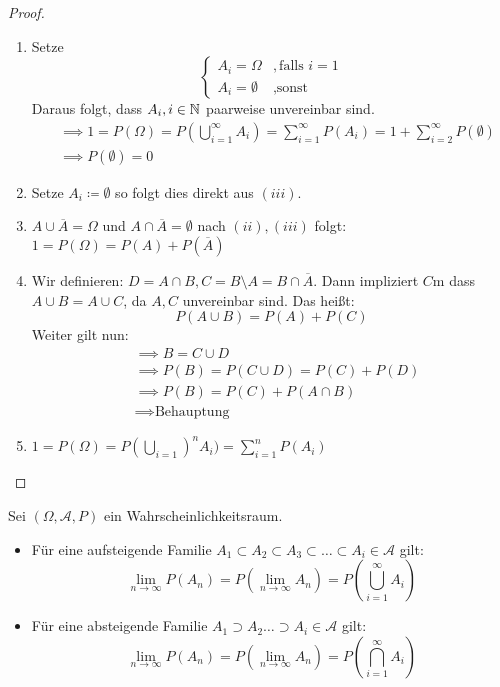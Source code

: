 \begin{proof}
\begin{enumerate}[label=\arabic*)]
	\item Setze \[\begin{cases}
			A_i = \Omega &, \text{falls } i=1 \\
			A_i = \emptyset &, \text{sonst}
		\end{cases} \]
		Daraus folgt, dass $A_i, i \in \mathbb{N}$ paarweise unvereinbar sind.
		\begin{align*}
			&\implies 1= P(\Omega) = P(\bigcup_{i=1}^{\infty} A_i) = \sum_{i=1}^{\infty}P(A_i) = 1+ \sum_{i=2}^{\infty}P(\emptyset) \\
			&\implies P(\emptyset)=0
		\end{align*}
	\item Setze $A_i \coloneqq \emptyset$ so folgt dies direkt aus $(iii)$.
	\item $A \cup \overline{A} = \Omega$ und $A \cap \overline{A}= \emptyset$ nach $(ii), (iii)$ folgt: $1=P(\Omega)= P(A)+P(\overline{A})$ 
	\item Wir definieren: $D= A \cap B, C= B \setminus A = B \cap \overline{A}$. Dann impliziert $C$m dass $A \cup B = A \cup C$, da $A,C$ unvereinbar sind. Das heißt:\[P(A \cup B) = P(A) + P(C)\]
	Weiter gilt nun:
	\begin{align*}
	&\implies B= C \cup D \\
	&\implies P(B) =P(C \cup D) = P(C) + P(D) \\
	&\implies P(B) = P(C) +P(A \cap B) \\
	&\implies \text{Behauptung}
	\end{align*}

	\item $1 = P(\Omega) = P( \bigcup_{i=1})^{n} A_i) = \sum_{i=1}^{n} P(A_i)$ 
\end{enumerate}
\end{proof}
\begin{theorem}
	Sei $(\Omega, \mathcal{A},P) $ ein Wahrscheinlichkeitsraum.
	\begin{itemize}
		\item Für eine aufsteigende Familie $A_1 \subset A_2 \subset A_3\subset \ldots\subset A_i \in \mathcal{A}$ gilt:
			\[
				\lim_{n \to \infty} P(A_n) = P(\lim_{n \to \infty} A_n) = P\left(\bigcup_{i=1}^{\infty} A_i\right)
			\]
		\item Für eine absteigende Familie $A_1 \supset A_2 \ldots \supset A_i \in \mathcal{A} $ gilt:
			\[
				\lim_{n \to \infty} P(A_n) = P(\lim_{n \to \infty} A_n) = P\left(\bigcap_{i=1}^{\infty} A_i \right)
			\]
	\end{itemize}

\end{theorem}

